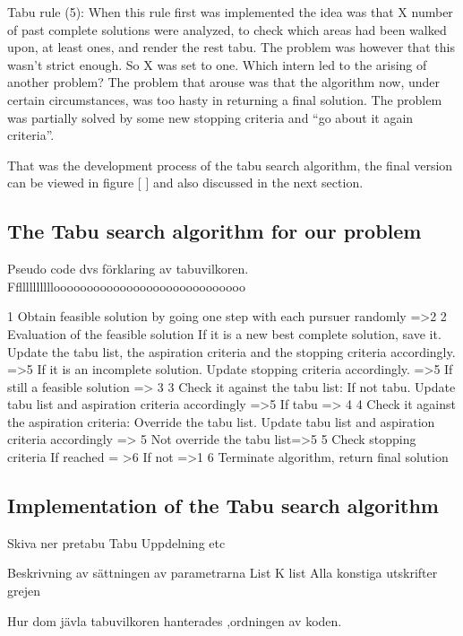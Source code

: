 Tabu rule (5):
When this rule first was implemented the idea was that X number of past complete solutions were analyzed, to check which areas had been walked upon, at least ones, and render the rest tabu.
The problem was however that this wasn’t strict enough. So X was set to one. Which intern led to the arising of another problem?
The problem that arouse was that the algorithm now, under certain circumstances, was too hasty in returning a final solution.
The problem was partially solved by some new stopping criteria and “go about it again criteria”.

That was the development process of the tabu search algorithm, the final version can be viewed in figure [ ] and also discussed in the next section.

 








\subsection{The Tabu search algorithm for our problem}

Pseudo code dvs förklaring av tabuvilkoren.
Ffllllllllllooooooooooooooooooooooooooooo


1
Obtain feasible solution by going one step with each pursuer randomly =>2
2
Evaluation of the feasible solution
If it is a new best complete solution, save it. Update the tabu list, the aspiration criteria and the stopping criteria accordingly. =>5
If it is an incomplete solution. Update stopping criteria accordingly. =>5
If still a feasible solution => 3
3
Check it against the tabu list:
If not tabu. Update tabu list and aspiration criteria accordingly =>5
If tabu => 4
4
Check it against the aspiration criteria:
Override the tabu list. Update tabu list and aspiration criteria accordingly => 5
Not override the tabu list=>5
5
Check stopping criteria
If reached = >6 
If not =>1
6
Terminate algorithm, return final solution


\subsection{Implementation of the Tabu search algorithm}


Skiva ner pretabu
Tabu 
Uppdelning etc

Beskrivning av sättningen av parametrarna List K list 
Alla konstiga utskrifter grejen


Hur dom jävla tabuvilkoren hanterades ,ordningen av koden.

